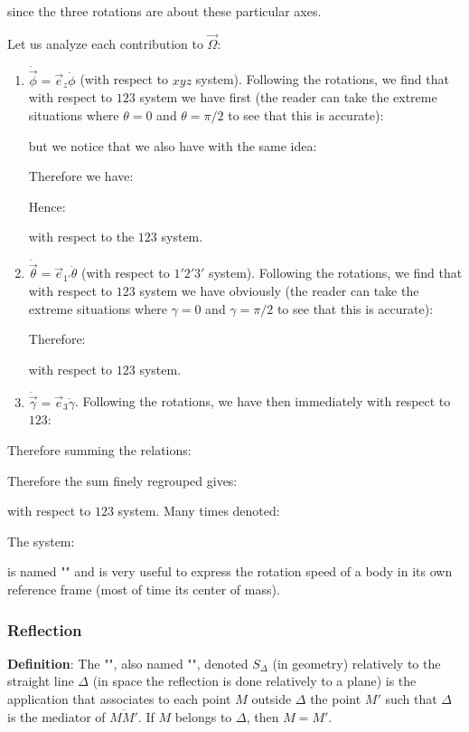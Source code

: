 	since the three rotations are about these particular axes.

	Let us analyze each contribution to $\vec{\Omega}$:
	\begin{enumerate}
		\item $\dot{\vec{\phi}}=\vec{e}_z\dot{\phi}$ (with respect to $xyz$ system). Following the rotations, we find that with respect to $123$ system we have first (the reader can take the extreme situations where $\theta=0$ and $\theta=\pi/2$ to see that this is accurate):
		
		but we notice that we also have with the same idea:
		
		Therefore we have:
		
		Hence:
		
		with respect to the $123$ system.
		
		\item $\dot{\vec{\theta}}=\vec{e}_{1'}\dot{\theta}$ (with respect to $1'2'3'$ system). Following the rotations, we find that with respect to $123$ system we have obviously (the reader can take the extreme situations where $\gamma=0$ and $\gamma=\pi/2$ to see that this is accurate):
		
		Therefore:
		
		with respect to $123$ system.

		\item $\dot{\vec{\gamma}}=\vec{e}_{3}\dot{\gamma}$. Following the rotations, we have then immediately with respect to $123$:
		
	\end{enumerate}
	Therefore summing the relations:
	
	Therefore the sum finely regrouped gives:
	
	with respect to $123$ system. Many times denoted:
	
	The system:
	
	is named "" and is very useful to express the rotation speed of a body in its own reference frame (most of time its center of mass).
	
	\pagebreak
	\subsubsection{Reflection}
	\textbf{Definition}: The "", also named "", denoted $S_\Delta$ (in geometry) relatively to the straight line $\Delta$ (in space the reflection is done relatively to a plane) is the application that associates to each point $M$ outside $\Delta$ the point $M'$ such that $\Delta$ is the mediator of $\overline{MM'}$. If $M$ belongs to $\Delta$, then $M=M'$.

